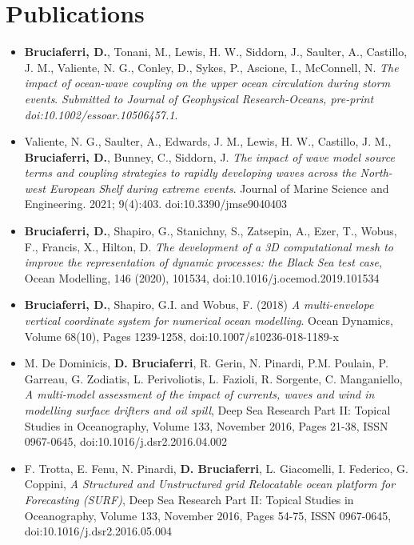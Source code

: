 \documentclass[a4paper, oneside, final]{scrartcl}
\begin{document}
\newpage

\section{Publications}
\noindent
\normalsize

\begin{itemize}
\item \textbf{Bruciaferri, D.}, Tonani, M., Lewis, H. W., Siddorn, J., Saulter, A., Castillo, J. M., Valiente, N. G., Conley, D., Sykes, P., Ascione, I., McConnell, N. \textit{The impact of ocean-wave coupling on the upper ocean circulation during storm events}. \textit{Submitted to Journal of Geophysical Research-Oceans, pre-print doi:10.1002/essoar.10506457.1}.
\item Valiente, N. G., Saulter, A., Edwards, J. M., Lewis, H. W., Castillo, J. M., \textbf{Bruciaferri, D.}, Bunney, C., Siddorn, J. \textit{The impact of wave model source terms and coupling strategies to rapidly developing waves across the North-west European Shelf during extreme events}. Journal of Marine Science and Engineering. 2021; 9(4):403. doi:10.3390/jmse9040403	
\item \textbf{Bruciaferri, D.}, Shapiro, G., Stanichny, S., Zatsepin, A., Ezer, T., Wobus, F., Francis, X., Hilton, D. \textit{The development of a 3D computational mesh to improve the representation of dynamic processes: the Black Sea test case}, Ocean Modelling, 146 (2020), 101534, doi:10.1016/j.ocemod.2019.101534
\item \textbf{Bruciaferri, D.}, Shapiro, G.I. and Wobus, F. (2018) \textit{A multi-envelope vertical coordinate system for numerical ocean modelling}. Ocean Dynamics, Volume 68(10), Pages 1239-1258, doi:10.1007/s10236-018-1189-x  
\item M. De Dominicis, \textbf{D. Bruciaferri}, R. Gerin, N. Pinardi, P.M. Poulain, P. Garreau, G. Zodiatis, L. Perivoliotis, L. Fazioli, R. Sorgente, C. Manganiello, \textit{A multi-model assessment of the impact of currents, waves and wind in modelling surface drifters and oil spill}, Deep Sea Research Part II: Topical Studies in Oceanography, Volume 133, November 2016, Pages 21-38, ISSN 0967-0645, doi:10.1016/j.dsr2.2016.04.002 
\item F. Trotta, E. Fenu, N. Pinardi, \textbf{D. Bruciaferri}, L. Giacomelli, I. Federico, G. Coppini, \textit{A Structured and Unstructured grid Relocatable ocean platform for Forecasting (SURF)}, Deep Sea Research Part II: Topical Studies in Oceanography, Volume 133, November 2016, Pages 54-75, ISSN 0967-0645, doi:10.1016/j.dsr2.2016.05.004

\end{itemize}
\end{document}
